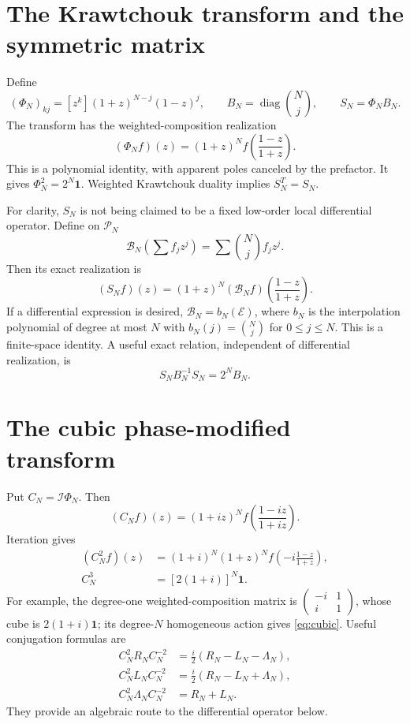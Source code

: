 \documentclass[11pt]{article}
\DeclareMathOperator{\diag}{diag}
\newcommand{\Id}{\mathbf 1}
\newcommand{\cI}{\mathcal I}
\newcommand{\Poly}{\mathcal P}
\begin{document}
\section{The Krawtchouk transform and the symmetric matrix}
Define
\[
 (\Phi_N)_{kj}=[z^k](1+z)^{N-j}(1-z)^j,\qquad
 B_N=\diag\binom Nj,\qquad S_N=\Phi_NB_N.
\]
The transform has the weighted-composition realization
\begin{equation}\label{eq:Phi}
 (\Phi_N f)(z)=(1+z)^N
 f\!\left(\frac{1-z}{1+z}\right).
\end{equation}
This is a polynomial identity, with apparent poles canceled by the
prefactor. It gives $\Phi_N^2=2^N\Id$.
Weighted Krawtchouk duality implies $S_N^T=S_N$.

For clarity, $S_N$ is not being claimed to be a fixed low-order
local differential operator. Define on $\Poly_N$
\[
 \mathscr B_N\!\left(\sum f_jz^j\right)
   =\sum\binom Nj f_jz^j.
\]
Then its exact realization is
\begin{equation}\label{eq:S}
 (S_Nf)(z)=(1+z)^N
 (\mathscr B_N f)\!\left(\frac{1-z}{1+z}\right).
\end{equation}
If a differential expression is desired, $\mathscr B_N=b_N(\mathcal E)$,
where $b_N$ is the interpolation polynomial of degree at most $N$ with
$b_N(j)=\binom Nj$ for $0\leq j\leq N$. This is a finite-space identity.
A useful exact relation, independent of differential realization, is
\begin{equation}\label{eq:normbridge}
 S_NB_N^{-1}S_N=2^NB_N.
\end{equation}

\section{The cubic phase-modified transform}
Put $C_N=\cI\Phi_N$. Then
\begin{equation}\label{eq:C}
 (C_Nf)(z)=(1+iz)^N
 f\!\left(\frac{1-iz}{1+iz}\right).
\end{equation}
Iteration gives
\begin{align}
 (C_N^2f)(z)&=(1+i)^N(1+z)^N
 f\!\left(-i\frac{1-z}{1+z}\right),\label{eq:C2}\\
 C_N^3&=[2(1+i)]^N\Id.\label{eq:cubic}
\end{align}
For example, the degree-one weighted-composition matrix is
$\begin{pmatrix}-i&1\\i&1\end{pmatrix}$, whose cube is
$2(1+i)\Id$; its degree-$N$ homogeneous action gives \eqref{eq:cubic}.
Useful conjugation formulas are
\begin{align}
 C_N^2R_NC_N^{-2}&=\frac i2(R_N-L_N-\Lambda_N),\\
 C_N^2L_NC_N^{-2}&=\frac i2(R_N-L_N+\Lambda_N),\\
 C_N^2\Lambda_NC_N^{-2}&=R_N+L_N.
\end{align}
They provide an algebraic route to the differential operator below.
\end{document}
